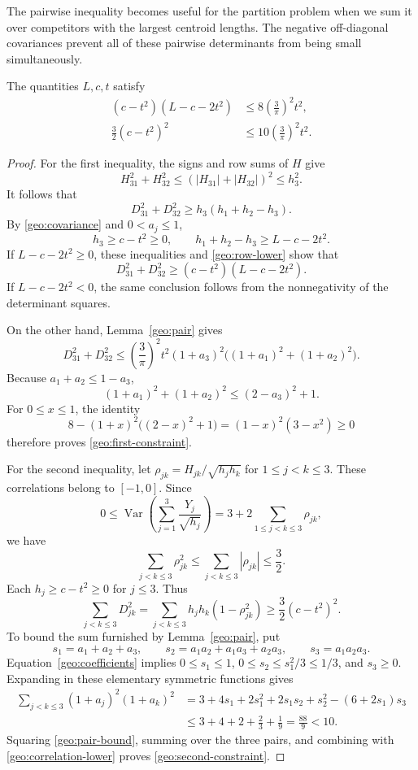The pairwise inequality becomes useful for the partition problem when
we sum it over competitors with the largest centroid lengths. The
negative off-diagonal covariances prevent all of these pairwise
determinants from being small simultaneously.

\begin{corollary}
\label{geo:constraints}
The quantities $L,c,t$ satisfy
\begin{align}
 (c-t^2)(L-c-2t^2)
 &\le8\left(\frac3\pi\right)^2t^2,
 \label{geo:first-constraint}\\
 \frac32(c-t^2)^2
 &\le10\left(\frac3\pi\right)^2t^2.
 \label{geo:second-constraint}
\end{align}
\end{corollary}

\begin{proof}
For the first inequality, the signs and row sums of $H$ give
\[
 H_{31}^2+H_{32}^2
 \le (|H_{31}|+|H_{32}|)^2\le h_3^2.
\]
It follows that
\begin{equation}
 D_{31}^2+D_{32}^2\ge h_3(h_1+h_2-h_3).
 \label{geo:row-lower}
\end{equation}
By \eqref{geo:covariance} and $0<a_j\le1$,
\[
 h_3\ge c-t^2\ge0,
 \qquad h_1+h_2-h_3\ge L-c-2t^2.
\]
If $L-c-2t^2\ge0$, these inequalities and \eqref{geo:row-lower}
show that
\[
 D_{31}^2+D_{32}^2\ge(c-t^2)(L-c-2t^2).
\]
If $L-c-2t^2<0$, the same conclusion follows from the
nonnegativity of the determinant squares.

On the other hand, Lemma~\ref{geo:pair} gives
\[
 D_{31}^2+D_{32}^2
 \le\left(\frac3\pi\right)^2t^2
 (1+a_3)^2\big((1+a_1)^2+(1+a_2)^2\big).
\]
Because $a_1+a_2\le1-a_3$,
\[
 (1+a_1)^2+(1+a_2)^2
 \le (2-a_3)^2+1.
\]
For $0\le x\le1$, the identity
\[
 8-(1+x)^2\big((2-x)^2+1\big)=(1-x)^2(3-x^2)\ge0
\]
therefore proves \eqref{geo:first-constraint}.

For the second inequality, let
$\rho_{jk}=H_{jk}/\sqrt{h_jh_k}$ for $1\le j<k\le3$.
These correlations belong to $[-1,0]$.  Since
\[
 0\le\operatorname{Var}\left(\sum_{j=1}^3\frac{Y_j}{\sqrt{h_j}}\right)
 =3+2\sum_{1\le j<k\le3}\rho_{jk},
\]
we have
\[
 \sum_{j<k\le3}\rho_{jk}^2
 \le\sum_{j<k\le3}|\rho_{jk}|\le\frac32.
\]
Each $h_j\ge c-t^2\ge0$ for $j\le3$.  Thus
\begin{equation}
 \sum_{j<k\le3}D_{jk}^2
 =\sum_{j<k\le3}h_jh_k(1-\rho_{jk}^2)
 \ge\frac32(c-t^2)^2.
 \label{geo:correlation-lower}
\end{equation}
To bound the sum furnished by Lemma~\ref{geo:pair}, put
\[
 s_1=a_1+a_2+a_3,\qquad
 s_2=a_1a_2+a_1a_3+a_2a_3,\qquad s_3=a_1a_2a_3.
\]
Equation~\eqref{geo:coefficients} implies
$0\le s_1\le1$, $0\le s_2\le s_1^2/3\le1/3$, and $s_3\ge0$.
Expanding in these elementary symmetric functions gives
\begin{align*}
 \sum_{j<k\le3}(1+a_j)^2(1+a_k)^2
 &=3+4s_1+2s_1^2+2s_1s_2+s_2^2-(6+2s_1)s_3\\
 &\le3+4+2+\frac23+\frac19=\frac{88}{9}<10.
\end{align*}
Squaring \eqref{geo:pair-bound}, summing over the three pairs, and
combining with \eqref{geo:correlation-lower} proves
\eqref{geo:second-constraint}.
\end{proof}
